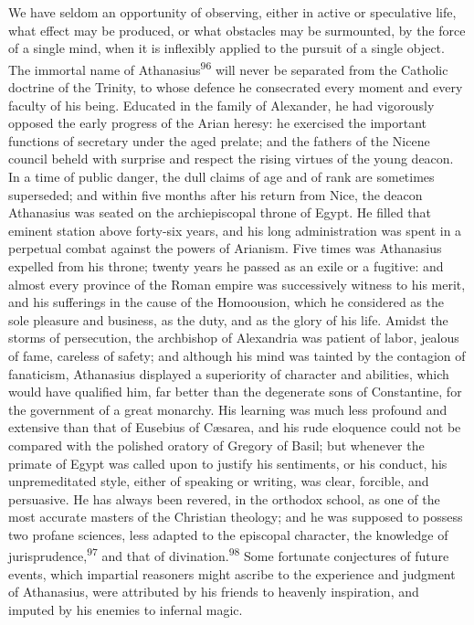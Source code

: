 We have seldom an opportunity of observing, either in active or
speculative life, what effect may be produced, or what obstacles
may be surmounted, by the force of a single mind, when it is
inflexibly applied to the pursuit of a single object. The
immortal name of Athanasius\textsuperscript{96} will never be separated from the
Catholic doctrine of the Trinity, to whose defence he consecrated
every moment and every faculty of his being. Educated in the
family of Alexander, he had vigorously opposed the early progress
of the Arian heresy: he exercised the important functions of
secretary under the aged prelate; and the fathers of the Nicene
council beheld with surprise and respect the rising virtues of
the young deacon. In a time of public danger, the dull claims of
age and of rank are sometimes superseded; and within five months
after his return from Nice, the deacon Athanasius was seated on
the archiepiscopal throne of Egypt. He filled that eminent
station above forty-six years, and his long administration was
spent in a perpetual combat against the powers of Arianism. Five
times was Athanasius expelled from his throne; twenty years he
passed as an exile or a fugitive: and almost every province of
the Roman empire was successively witness to his merit, and his
sufferings in the cause of the Homoousion, which he considered as
the sole pleasure and business, as the duty, and as the glory of
his life. Amidst the storms of persecution, the archbishop of
Alexandria was patient of labor, jealous of fame, careless of
safety; and although his mind was tainted by the contagion of
fanaticism, Athanasius displayed a superiority of character and
abilities, which would have qualified him, far better than the
degenerate sons of Constantine, for the government of a great
monarchy. His learning was much less profound and extensive than
that of Eusebius of Cæsarea, and his rude eloquence could not be
compared with the polished oratory of Gregory of Basil; but
whenever the primate of Egypt was called upon to justify his
sentiments, or his conduct, his unpremeditated style, either of
speaking or writing, was clear, forcible, and persuasive. He has
always been revered, in the orthodox school, as one of the most
accurate masters of the Christian theology; and he was supposed
to possess two profane sciences, less adapted to the episcopal
character, the knowledge of jurisprudence,\textsuperscript{97} and that of
divination.\textsuperscript{98} Some fortunate conjectures of future events, which
impartial reasoners might ascribe to the experience and judgment
of Athanasius, were attributed by his friends to heavenly
inspiration, and imputed by his enemies to infernal magic.

